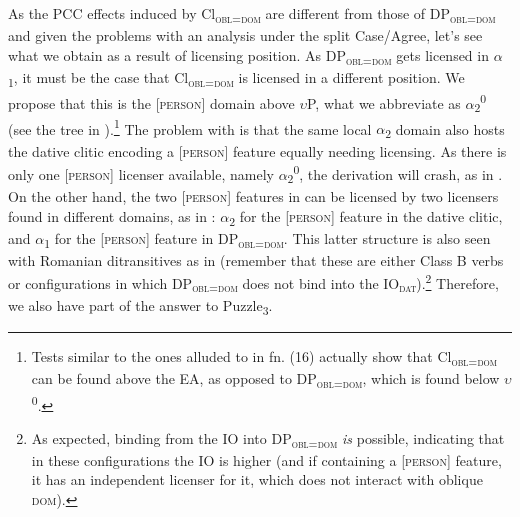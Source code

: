 \documentclass[output=paper,colorlinks,citecolor=brown,draft,draftmode]{langscibook}
\begin{document}
As the PCC effects induced by Cl\textsubscript{\textsc{obl=dom}} are different from those of DP\textsubscript{\textsc{obl=dom}} and given the problems with an analysis under the split Case/Agree, let's see what we obtain as a result of licensing position. As DP\textsubscript{\textsc{obl=dom}} gets licensed in  $\alpha$\textsubscript{1}, it must be the case that Cl\textsubscript{\textsc{obl=dom}} is licensed in a different position. We propose that this is the [\textsc{person}] domain above $\upsilon$P, what we abbreviate as $\alpha$\textsubscript{2}\textsuperscript{0} (see the tree in ).\footnote{Tests similar to the ones alluded to in fn. (16) actually show that Cl\textsubscript{\textsc{obl=dom}} can be found above the EA, as opposed to DP\textsubscript{\textsc{obl=dom}}, which is found below $\upsilon$\textsuperscript{0}.} The problem with  is that the same local $\alpha$\textsubscript{2} domain also hosts the dative clitic encoding a [\textsc{person}] feature equally needing licensing. As there is only one [\textsc{person]} licenser available, namely $\alpha$\textsubscript{2}\textsuperscript{0}, the derivation will crash, as in . On the other hand, the two [\textsc{person}] features in  can be licensed by two licensers found in different domains, as in : $\alpha$\textsubscript{2} for the [\textsc{person}] feature in the dative clitic, and $\alpha$\textsubscript{1} for the [\textsc{person}] feature in DP\textsubscript{\textsc{obl=dom}}. This latter structure is also seen with Romanian ditransitives as in  (remember that these are either Class B verbs or configurations in which DP\textsubscript{\textsc{obl=dom}} does not bind into the IO\textsubscript{\textsc{dat}}).\footnote{As expected, binding from the IO into DP\textsubscript{\textsc{obl=dom}} \textit{is} possible, indicating that in these configurations the IO is higher (and if containing a [\textsc{person}] feature, it has an independent licenser for it, which does not interact with oblique \textsc{dom}).} Therefore, we also have part of the answer to {Puzzle}\textsubscript{3}.
\end{document}
